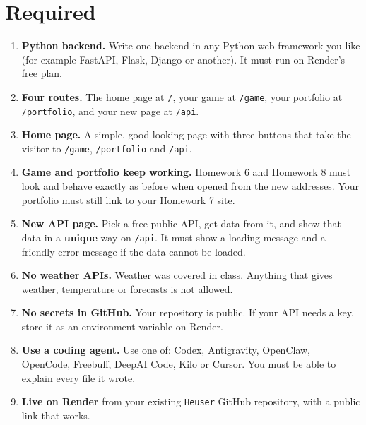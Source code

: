 \documentclass[11pt,a4paper]{article}
\begin{document}
\section{Required}
\begin{enumerate}
\item \textbf{Python backend.} Write one backend in any Python web framework you like (for example FastAPI, Flask, Django or another). It must run on Render's free plan.
\item \textbf{Four routes.} The home page at \texttt{/}, your game at \texttt{/game}, your portfolio at \texttt{/portfolio}, and your new page at \texttt{/api}.
\item \textbf{Home page.} A simple, good-looking page with three buttons that take the visitor to \texttt{/game}, \texttt{/portfolio} and \texttt{/api}.
\item \textbf{Game and portfolio keep working.} Homework 6 and Homework 8 must look and behave exactly as before when opened from the new addresses. Your portfolio must still link to your Homework 7 site.
\item \textbf{New API page.} Pick a free public API, get data from it, and show that data in a \textbf{unique} way on \texttt{/api}. It must show a loading message and a friendly error message if the data cannot be loaded.
\item \textbf{No weather APIs.} Weather was covered in class. Anything that gives weather, temperature or forecasts is not allowed.
\item \textbf{No secrets in GitHub.} Your repository is public. If your API needs a key, store it as an environment variable on Render.
\item \textbf{Use a coding agent.} Use one of: Codex, Antigravity, OpenClaw, OpenCode, Freebuff, DeepAI Code, Kilo or Cursor. You must be able to explain every file it wrote.
\item \textbf{Live on Render} from your existing \texttt{Heuser} GitHub repository, with a public link that works.
\end{enumerate}
\end{document}
